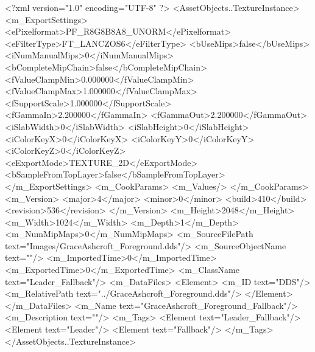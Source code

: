 <?xml version="1.0" encoding="UTF-8" ?>
<AssetObjects..TextureInstance>
	<m_ExportSettings>
		<ePixelformat>PF_R8G8B8A8_UNORM</ePixelformat>
		<eFilterType>FT_LANCZOS6</eFilterType>
		<bUseMips>false</bUseMips>
		<iNumManualMips>0</iNumManualMips>
		<bCompleteMipChain>false</bCompleteMipChain>
		<fValueClampMin>0.000000</fValueClampMin>
		<fValueClampMax>1.000000</fValueClampMax>
		<fSupportScale>1.000000</fSupportScale>
		<fGammaIn>2.200000</fGammaIn>
		<fGammaOut>2.200000</fGammaOut>
		<iSlabWidth>0</iSlabWidth>
		<iSlabHeight>0</iSlabHeight>
		<iColorKeyX>0</iColorKeyX>
		<iColorKeyY>0</iColorKeyY>
		<iColorKeyZ>0</iColorKeyZ>
		<eExportMode>TEXTURE_2D</eExportMode>
		<bSampleFromTopLayer>false</bSampleFromTopLayer>
	</m_ExportSettings>
	<m_CookParams>
		<m_Values/>
	</m_CookParams>
	<m_Version>
		<major>4</major>
		<minor>0</minor>
		<build>410</build>
		<revision>536</revision>
	</m_Version>
	<m_Height>2048</m_Height>
	<m_Width>1024</m_Width>
	<m_Depth>1</m_Depth>
	<m_NumMipMaps>0</m_NumMipMaps>
	<m_SourceFilePath text="Images/GraceAshcroft_Foreground.dds"/>
	<m_SourceObjectName text=""/>
	<m_ImportedTime>0</m_ImportedTime>
	<m_ExportedTime>0</m_ExportedTime>
	<m_ClassName text="Leader_Fallback"/>
	<m_DataFiles>
		<Element>
			<m_ID text="DDS"/>
			<m_RelativePath text="../GraceAshcroft_Foreground.dds"/>
		</Element>
	</m_DataFiles>
	<m_Name text="GraceAshcroft_Foreground_Fallback"/>
	<m_Description text=""/>
	<m_Tags>
		<Element text="Leader_Fallback"/>
		<Element text="Leader"/>
		<Element text="Fallback"/>
	</m_Tags>
</AssetObjects..TextureInstance>

